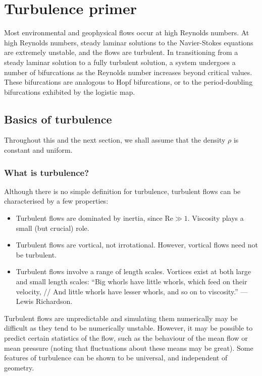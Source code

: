 \newpage
\chapter{Turbulence primer} \label{section2}

Most environmental and geophysical flows occur at high Reynolds numbers. At high
Reynolds numbers, steady laminar solutions to the Navier-Stokes equations are
extremely unstable, and the flows are turbulent. In transitioning from a steady
laminar solution to a fully turbulent solution, a system undergoes a number of
bifurcations as the Reynolds number increases beyond critical values. These
bifurcations are analogous to Hopf bifurcations, or to the period-doubling
bifurcations exhibited by the logistic map.

\section{Basics of turbulence}

Throughout this and the next section, we shall assume that the density $\rho$ is
constant and uniform.

\subsection{What is turbulence?}

Although there is no simple definition for turbulence, turbulent flows can be
characterised by a few properties:
\begin{itemize}
    \item Turbulent flows are dominated by inertia, since $\mathrm{Re}\gg1$.
        Viscosity plays a small (but crucial) role.
    \item Turbulent flows are vortical, not irrotational. However, vortical
        flows need not be turbulent.
    \item Turbulent flows involve a range of length scales. Vortices exist at
        both large and small length scales: ``Big whorls have little whorls,
        which feed on their velocity, // And little whorls have lesser whorls,
        and so on to viscosity.'' ---Lewis Richardson.
\end{itemize}
Turbulent flows are unpredictable and simulating them numerically may be
difficult as they tend to be numerically unstable. However, it may be possible
to predict certain statistics of the flow, such as the behaviour of the mean
flow or mean pressure (noting that fluctuations about these means may be great).
Some features of turbulence can be shown to be universal, and independent of
geometry.

